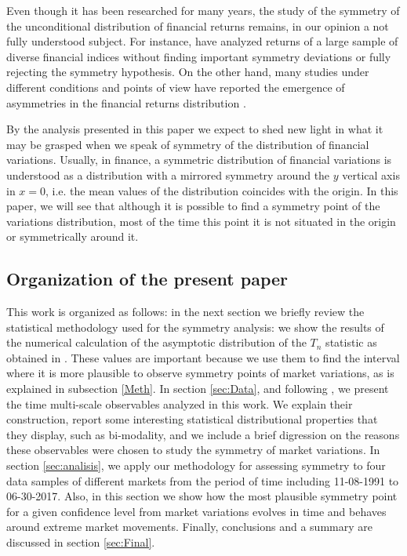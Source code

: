 \documentclass{elsarticle}
\begin{document}
Even though it has been researched for many years, the study of the symmetry of the unconditional distribution of financial returns remains, in our opinion a not fully understood subject. For instance, \cite{peiro,peiro2} have analyzed returns of a large sample of diverse financial indices without finding important symmetry deviations or fully rejecting the symmetry hypothesis. On the other hand, many studies under different conditions and points of view have reported the emergence of asymmetries in the financial returns distribution \cite{Lillo,Jiang,Jensen,Karpio,Jun,Savona,Duarte,Zoltan,Grech,Coronel-Montoya,Vitalies,Takayasu}.

By the analysis presented in this paper we expect to shed new light in what it may be grasped when we speak of symmetry of the distribution of financial variations. Usually, in finance, a symmetric distribution of financial variations is understood as a distribution with a mirrored symmetry around the $y$ vertical axis in $x=0$, i.e. the mean values of the distribution coincides with the origin. In this paper, we will see that although it is possible to find a symmetry point of the variations distribution, most of the time this point it is not situated in the origin or symmetrically around it. 

\subsection{Organization of the present paper}

This work is organized as follows: in the next section we briefly review the statistical methodology used for the symmetry analysis: we show the results of the numerical calculation of the asymptotic distribution of the $T_n$ statistic as obtained in \cite{Coronel-Montoya}. These values are important because we use them to find the interval where it is more plausible to observe symmetry points of market variations, as is explained in subsection \ref{Meth}. In section \ref{sec:Data}, and following \cite{Olivares}, we present the time multi-scale observables analyzed in this work. We explain their construction, report some interesting statistical distributional properties that they display, such as bi-modality, and we include a brief digression on the reasons these observables were chosen to study the symmetry of market variations. In section \ref{sec:analisis}, we apply our methodology for assessing symmetry to four data samples of different markets from the period of time including 11-08-1991 to 06-30-2017. Also, in this section we show how the most plausible symmetry point for a given confidence level from market variations evolves in time and behaves around extreme market movements. Finally, conclusions and a summary are discussed in section \ref{sec:Final}.
\end{document}
